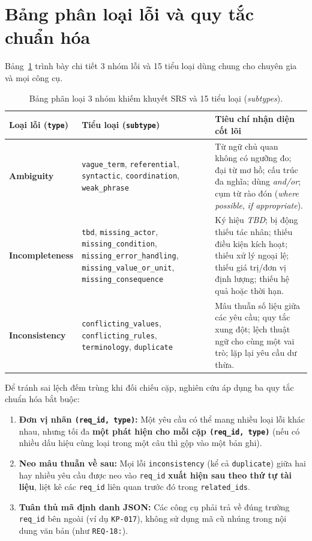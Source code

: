 \documentclass[12pt,a4paper]{report}
\begin{document}
\section{Bảng phân loại lỗi và quy tắc chuẩn hóa}
Bảng~\ref{tab:taxonomy} trình bày chi tiết 3 nhóm lỗi và 15 tiểu loại dùng chung cho chuyên gia và mọi công cụ.

\begin{table}[H]
\centering
\caption{Bảng phân loại 3 nhóm khiếm khuyết SRS và 15 tiểu loại (\textit{subtypes}).}
\label{tab:taxonomy}
\small
\begin{tabular}{p{2.7cm}p{4.3cm}p{7.4cm}}
\toprule
\textbf{Loại lỗi (\texttt{type})} & \textbf{Tiểu loại (\texttt{subtype})} & \textbf{Tiêu chí nhận diện cốt lõi} \\
\midrule
\textbf{Ambiguity} & \texttt{vague\_term}, \texttt{referential}, \texttt{syntactic}, \texttt{coordination}, \texttt{weak\_phrase} & Từ ngữ chủ quan không có ngưỡng đo; đại từ mơ hồ; cấu trúc đa nghĩa; dùng \textit{and/or}; cụm từ rào đón (\textit{where possible}, \textit{if appropriate}). \\
\midrule
\textbf{Incompleteness} & \texttt{tbd}, \texttt{missing\_actor}, \texttt{missing\_condition}, \texttt{missing\_error\_handling}, \texttt{missing\_value\_or\_unit}, \texttt{missing\_consequence} & Ký hiệu \textit{TBD}; bị động thiếu tác nhân; thiếu điều kiện kích hoạt; thiếu xử lý ngoại lệ; thiếu giá trị/đơn vị định lượng; thiếu hệ quả hoặc thời hạn. \\
\midrule
\textbf{Inconsistency} & \texttt{conflicting\_values}, \texttt{conflicting\_rules}, \texttt{terminology}, \texttt{duplicate} & Mâu thuẫn số liệu giữa các yêu cầu; quy tắc xung đột; lệch thuật ngữ cho cùng một vai trò; lặp lại yêu cầu dư thừa. \\
\bottomrule
\end{tabular}
\end{table}

Để tránh sai lệch đếm trùng khi đối chiếu cặp, nghiên cứu áp dụng ba quy tắc chuẩn hóa bắt buộc:
\begin{enumerate}
  \item \textbf{Đơn vị nhãn \texttt{(req\_id, type)}:} Một yêu cầu có thể mang nhiều loại lỗi khác nhau, nhưng tối đa \textbf{một phát hiện cho mỗi cặp \texttt{(req\_id, type)}} (nếu có nhiều dấu hiệu cùng loại trong một câu thì gộp vào một bản ghi).
  \item \textbf{Neo mâu thuẫn về sau:} Mọi lỗi \texttt{inconsistency} (kể cả \texttt{duplicate}) giữa hai hay nhiều yêu cầu được neo vào \texttt{req\_id} \textbf{xuất hiện sau theo thứ tự tài liệu}, liệt kê các \texttt{req\_id} liên quan trước đó trong \texttt{related\_ids}.
  \item \textbf{Tuân thủ mã định danh JSON:} Các công cụ phải trả về đúng trường \texttt{req\_id} bên ngoài (ví dụ \texttt{KP-017}), không sử dụng mã cũ nhúng trong nội dung văn bản (như \texttt{REQ-18:}).
\end{enumerate}
\end{document}
